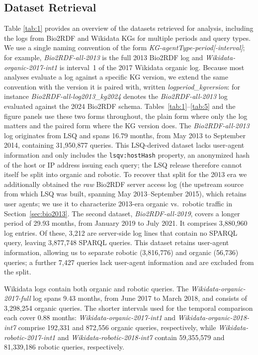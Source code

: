 \documentclass[sw]{iosart2x}
\begin{document}
\subsection{Dataset Retrieval }
Table \ref{tab:1} provides an overview of the datasets retrieved for analysis, including the logs from Bio2RDF and Wikidata KGs for multiple periods and query types. We use a single naming convention of the form \emph{KG-agentType-period[-interval]}; for example, \emph{Bio2RDF-all-2013} is the full 2013 Bio2RDF log and \emph{Wikidata-organic-2017-int1} is interval~1 of the 2017 Wikidata organic log. Because most analyses evaluate a log against a specific KG version, we extend the same convention with the version it is paired with, written \emph{log\textlangle period\textrangle\_kg\textlangle version\textrangle}: for instance \emph{Bio2RDF-all-log2013\_kg2024} denotes the \emph{Bio2RDF-all-2013} log evaluated against the 2024 Bio2RDF schema. Tables~\ref{tab:1}--\ref{tab:5} and the figure panels use these two forms throughout, the plain form where only the log matters and the paired form where the KG version does. The \emph{Bio2RDF-all-2013} log originates from LSQ and spans 16.79 months, from May 2013 to September 2014, containing 31,950,877 queries. This LSQ-derived dataset lacks user-agent information and only includes the \texttt{lsqv:hostHash} property, an anonymized hash of the host or IP address issuing each query; the LSQ release therefore cannot itself be split into organic and robotic. To recover that split for the 2013 era we additionally obtained the \emph{raw} Bio2RDF server access log (the upstream source from which LSQ was built, spanning May 2013--September 2015), which retains user agents; we use it to characterize 2013-era organic vs.\ robotic traffic in Section~\ref{sec:bio2013}. The second dataset, \emph{Bio2RDF-all-2019}, covers a longer period of 29.93 months, from January 2019 to July 2021. It comprises 3,880,960 log entries. Of these, 3,212 are server-side log lines that contain no SPARQL query, leaving 3,877,748 SPARQL queries. This dataset retains user-agent information, allowing us to separate robotic (3,816,776) and organic (56,736) queries; a further 7,427 queries lack user-agent information and are excluded from the split.

Wikidata logs contain both organic and robotic queries. The \emph{Wikidata-organic-2017-full} log spans 9.43 months, from June 2017 to March 2018, and consists of 3,298,254 organic queries. The shorter intervals used for the temporal comparison each cover 0.88 months: \emph{Wikidata-organic-2017-int1} and \emph{Wikidata-organic-2018-int7} comprise 192,331 and 872,556 organic queries, respectively, while \emph{Wikidata-robotic-2017-int1} and \emph{Wikidata-robotic-2018-int7} contain 59,355,579 and 81,339,186 robotic queries, respectively.
\end{document}
